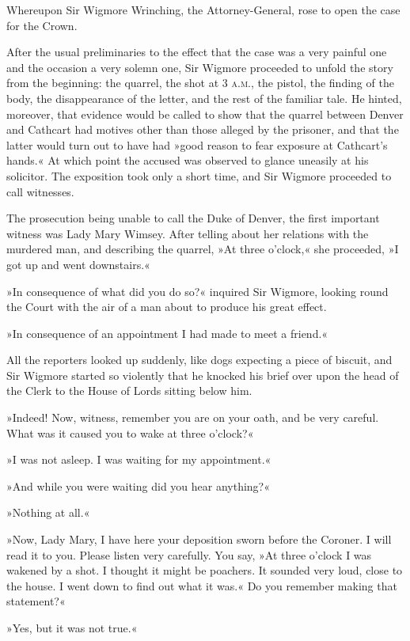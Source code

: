 Whereupon Sir Wigmore Wrinching, the Attorney-General, rose to open the case for the Crown.

After the usual preliminaries to the effect that the case was a very painful one and the occasion a very solemn one, Sir Wigmore proceeded to unfold the story from the beginning: the quarrel, the shot at 3 \textsc{a.m.}, the pistol, the finding of the body, the disappearance of the letter, and the rest of the familiar tale. He hinted, moreover, that evidence would be called to show that the quarrel between Denver and Cathcart had motives other than those alleged by the prisoner, and that the latter would turn out to have had »good reason to fear exposure at Cathcart's hands.« At which point the accused was observed to glance uneasily at his solicitor. The exposition took only a short time, and Sir Wigmore proceeded to call witnesses.

The prosecution being unable to call the Duke of Denver, the first important witness was Lady Mary Wimsey. After telling about her relations with the murdered man, and describing the quarrel, »At three o'clock,« she proceeded, »I got up and went downstairs.«

»In consequence of what did you do so?« inquired Sir Wigmore, looking round the Court with the air of a man about to produce his great effect.

»In consequence of an appointment I had made to meet a friend.«

All the reporters looked up suddenly, like dogs expecting a piece of biscuit, and Sir Wigmore started so violently that he knocked his brief over upon the head of the Clerk to the House of Lords sitting below him.

»Indeed! Now, witness, remember you are on your oath, and be very careful. What was it caused you to wake at three o'clock?«

»I was not asleep. I was waiting for my appointment.«

»And while you were waiting did you hear anything?«

»Nothing at all.«

»Now, Lady Mary, I have here your deposition sworn before the Coroner.  I will read it to you. Please listen very carefully. You say, »At three o'clock I was wakened by a shot. I thought it might be poachers. It sounded very loud, close to the house. I went down to find out what it was.« Do you remember making that statement?«

»Yes, but it was not true.«

